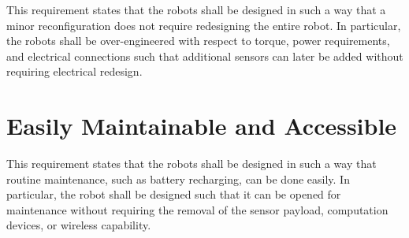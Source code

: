 This requirement states that the robots shall be designed in such a way that a minor reconfiguration does not require redesigning the entire robot. In particular, the robots shall be over-engineered with respect to torque, power requirements, and electrical connections such that additional sensors can later be added without requiring electrical redesign.

\section{Easily Maintainable and Accessible}

This requirement states that the robots shall be designed in such a way that routine maintenance, such as battery recharging, can be done easily. In particular, the robot shall be designed such that it can be opened for maintenance without requiring the removal of the sensor payload, computation devices, or wireless capability.
